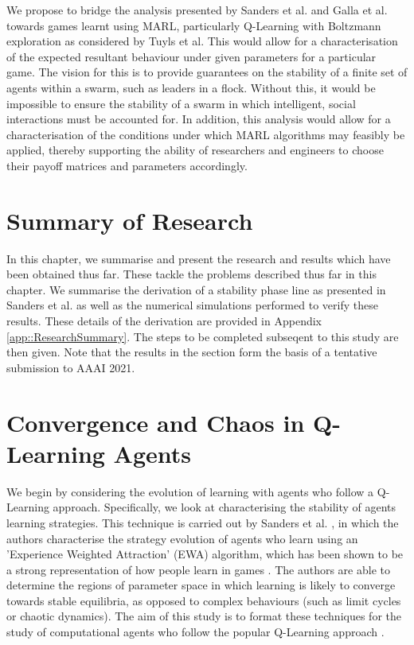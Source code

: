 \documentclass[.../main.tex]{subfiles}
\begin{document}
    We propose to bridge the analysis presented by Sanders
    et al. and Galla et al. towards games learnt using MARL, particularly Q-Learning with
    Boltzmann exploration as considered by Tuyls et al. This would allow for a characterisation of
    the expected resultant behaviour under given parameters for a particular game. The vision for
    this is to provide guarantees on the stability of a finite set of agents within a swarm, such as
    leaders in a flock. Without this, it would be impossible to ensure the stability of a swarm in
    which intelligent, social interactions must be accounted for. In addition, this analysis
    would allow for a characterisation of the conditions under which MARL algorithms may
    feasibly be applied, thereby supporting the ability of researchers and engineers to choose their
    payoff matrices and parameters accordingly.

\section{Summary of Research}

    In this chapter, we summarise and present the research and results
    which have been obtained thus far. These tackle the problems
    described thus far in this chapter. We summarise the
    derivation of a stability phase line as presented in Sanders et
    al. \cite{Sanders2018} as well as the numerical simulations
    performed to verify these results. These details of the derivation are provided in Appendix 
    \ref{app::ResearchSummary}. The steps to be completed
    subseqent to this study are then given. Note that the results in the section form the basis of a
    tentative submission to AAAI 2021. 

    \section{Convergence and Chaos in Q-Learning Agents} \label{sec::Chaos_in_Q-Learning}

    We begin by considering the evolution of learning with agents who
    follow a Q-Learning approach.  Specifically, we look at
    characterising the stability of agents learning strategies. This
    technique is carried out by Sanders et al. \cite{Sanders2018}, in
    which the authors characterise the strategy evolution of agents
    who learn using an 'Experience Weighted Attraction' (EWA)
    algorithm, which has been shown to be a strong representation of how
    people learn in games \cite{Camerer1999, Camerer2003}. The authors are able to determine the
    regions of parameter space in which learning is likely to converge
    towards stable equilibria, as opposed to complex behaviours
    (such as limit cycles or chaotic dynamics). The aim of this study
    is to format these techniques for the study of computational
    agents who follow the popular Q-Learning approach
    \cite{Sutton2018,SchwartzMulti-agentApproach}.
\end{document}
